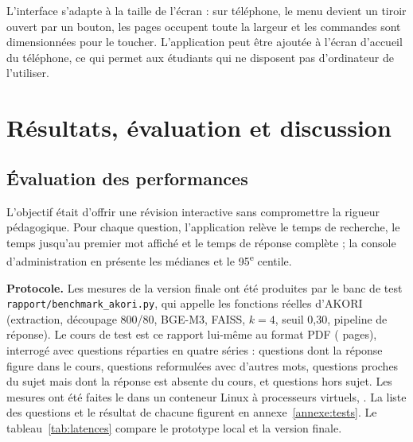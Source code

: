 \documentclass[12pt,a4paper,oneside]{report}
\begin{document}
L'interface s'adapte à la taille de l'écran : sur téléphone, le menu devient un tiroir ouvert par un bouton, les pages occupent toute la largeur et les commandes sont dimensionnées pour le toucher. L'application peut être ajoutée à l'écran d'accueil du téléphone, ce qui permet aux étudiants qui ne disposent pas d'ordinateur de l'utiliser.

\chapter{Résultats, évaluation et discussion}\label{chap:resultats}

\section{Évaluation des performances}

L'objectif était d'offrir une révision interactive sans compromettre la rigueur pédagogique. Pour chaque question, l'application relève le temps de recherche, le temps jusqu'au premier mot affiché et le temps de réponse complète ; la console d'administration en présente les médianes et le 95\textsuperscript{e} centile.

\textbf{Protocole.} Les mesures de la version finale ont été produites par le banc de test \texttt{rapport/benchmark\_akori.py}, qui appelle les fonctions réelles d'AKORI (extraction, découpage 800/80, BGE-M3, FAISS, $k=4$, seuil 0,30, pipeline de réponse). Le cours de test est ce rapport lui-même au format PDF (\IdxPages{} pages), interrogé avec \RechN{} questions réparties en quatre séries : \SeuilCoursN{} questions dont la réponse figure dans le cours, \SeuilRefoN{} questions reformulées avec d'autres mots, \SeuilAbsN{} questions proches du sujet mais dont la réponse est absente du cours, et \SeuilHorsN{} questions hors sujet. Les mesures ont été faites le \BenchDate{} dans un conteneur Linux à \BenchCPU{} processeurs virtuels, \BenchMateriel. La liste des questions et le résultat de chacune figurent en annexe~\ref{annexe:tests}. Le tableau~\ref{tab:latences} compare le prototype local et la version finale.
\end{document}
